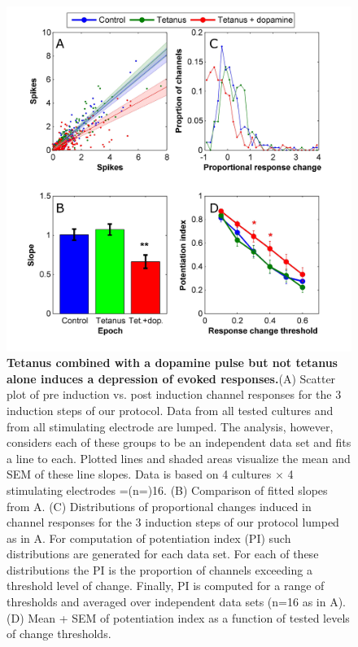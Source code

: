         \begin{figure}[!htb]
         \centering
         \includegraphics[width=15cm]{chapter3/figures/tetResChangeStats/tetResChangeStats.jpg}

         \caption[Statistics of changes to evoked responses in the combined dopamine and tetanus plasticity induction experiment]{\textbf{Tetanus combined with a dopamine pulse but not tetanus alone induces a depression of evoked responses.}(A) Scatter plot of pre induction vs. post induction channel responses for the 3 induction steps of our protocol. Data from all tested cultures and from all stimulating electrode are lumped. The analysis, however, considers each of these groups to be an independent data set and fits a line to each. Plotted lines and shaded areas visualize the mean and SEM of these line slopes. Data is based on 4 cultures \(\times\) 4 stimulating electrodes =(n=)16. (B) Comparison of fitted slopes from A. (C) Distributions of proportional changes induced in channel responses for the 3 induction steps of our protocol lumped as in A. For computation of potentiation index (PI) such distributions are generated for each data set. For each of these distributions the PI is the proportion of channels exceeding a threshold level of change. Finally, PI is computed for a range of thresholds and averaged over independent data sets (n=16 as in A). (D) Mean + SEM of potentiation index as a function of tested levels of change thresholds.}
         \label{fig:activity:tetResChange}
    \end{figure}


